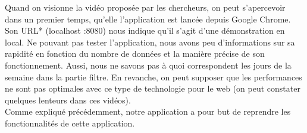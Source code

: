 \documentclass[12pt]{article}
\begin{document}
	Quand on visionne la vidéo proposée par les chercheurs, on peut s'apercevoir dans un premier
	temps, qu'elle l’application est lancée depuis Google Chrome. Son URL* (localhost :8080)
	nous indique qu’il s’agit d’une démonstration en local. Ne pouvant pas tester l’application,
	nous avons peu d’informations sur sa rapidité en fonction du nombre de données et la manière
	précise de son fonctionnement. Aussi, nous ne savons pas à quoi correspondent les jours de la
	semaine dans la partie filtre. En revanche, on peut supposer que les performances ne
	sont pas optimales avec ce type de technologie pour le web (on peut constater
	quelques lenteurs dans ces vidéos).\\
	Comme expliqué précédemment, notre application a pour but de reprendre les
	fonctionnalités de cette application.
	
\newpage
\end{document}

